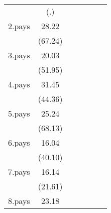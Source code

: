 {\begin{tabular}{l*{6}{c}}
                    &         (.)         &                     &                     &                     &                     &                     \\
[1em]
2.pays              &       28.22\sym{***}&                     &                     &                     &                     &                     \\
                    &     (67.24)         &                     &                     &                     &                     &                     \\
[1em]
3.pays              &       20.03\sym{***}&                     &                     &                     &                     &                     \\
                    &     (51.95)         &                     &                     &                     &                     &                     \\
[1em]
4.pays              &       31.45\sym{***}&                     &                     &                     &                     &                     \\
                    &     (44.36)         &                     &                     &                     &                     &                     \\
[1em]
5.pays              &       25.24\sym{***}&                     &                     &                     &                     &                     \\
                    &     (68.13)         &                     &                     &                     &                     &                     \\
[1em]
6.pays              &       16.04\sym{***}&                     &                     &                     &                     &                     \\
                    &     (40.10)         &                     &                     &                     &                     &                     \\
[1em]
7.pays              &       16.14\sym{***}&                     &                     &                     &                     &                     \\
                    &     (21.61)         &                     &                     &                     &                     &                     \\
[1em]
8.pays              &       23.18\sym{***}&                     &                     &                     &                     &                     \\

\end{tabular}}
